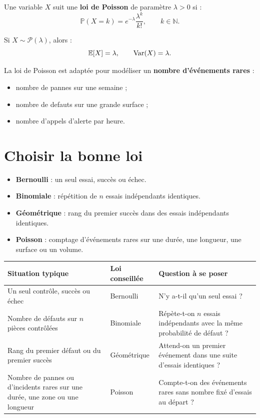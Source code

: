 \begin{Def}
Une variable $X$ suit une \textbf{loi de Poisson} de paramètre $\lambda>0$ si :
$$
\mathbb{P}(X=k)=e^{-\lambda}\frac{\lambda^k}{k!}, \qquad k\in \mathbb{N}.
$$
\end{Def}

\begin{Prop}
Si $X\sim \mathcal{P}(\lambda)$, alors :
$$
\mathbb{E}[X]=\lambda, \qquad \operatorname{Var}(X)=\lambda.
$$
\end{Prop}

\begin{Ex}
La loi de Poisson est adaptée pour modéliser un \textbf{nombre d'événements rares} :
\begin{itemize}
    \item nombre de pannes sur une semaine ;
    \item nombre de defauts sur une grande surface ;
    \item nombre d'appels d'alerte par heure.
\end{itemize}
\end{Ex}

\section{Choisir la bonne loi}

\begin{Meth}
\begin{itemize}
    \item \textbf{Bernoulli} : un seul essai, succès ou échec.
    \item \textbf{Binomiale} : répétition de $n$ essais indépendants identiques.
    \item \textbf{Géométrique} : rang du premier succès dans des essais indépendants identiques.
    \item \textbf{Poisson} : comptage d'événements rares sur une durée, une longueur, une surface ou un volume.
\end{itemize}
\end{Meth}

\begin{center}
\renewcommand{\arraystretch}{1.4}
\begin{tabular}{|m{4cm}|m{4.3cm}|m{5cm}|}
\hline
\textbf{Situation typique} & \textbf{Loi conseillée} & \textbf{Question à se poser} \\
\hline
Un seul contrôle, succès ou échec & Bernoulli & N'y a-t-il qu'un seul essai ? \\
\hline
Nombre de défauts sur $n$ pièces contrôlées & Binomiale & Répète-t-on $n$ essais indépendants avec la même probabilité de défaut ? \\
\hline
Rang du premier défaut ou du premier succès & Géométrique & Attend-on un premier événement dans une suite d'essais identiques ? \\
\hline
Nombre de pannes ou d'incidents rares sur une durée, une zone ou une longueur & Poisson & Compte-t-on des événements rares sans nombre fixé d'essais au départ ? \\
\hline
\end{tabular}
\end{center}

